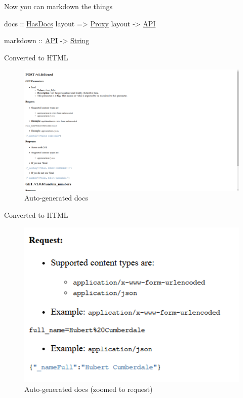 \documentclass[ignorenonframetext,]{beamer}
\newenvironment{Shaded}{}{}
\newcommand{\DataTypeTok}[1]{\underline{{#1}}}
\newcommand{\OtherTok}[1]{{#1}}
\newcommand{\NormalTok}[1]{{#1}}
\begin{document}
\begin{frame}[fragile]{Now you can markdown the things}

\begin{Shaded}
\begin{Highlighting}[]
\OtherTok{docs ::} \DataTypeTok{HasDocs} \NormalTok{layout }\OtherTok{=>} \DataTypeTok{Proxy} \NormalTok{layout }\OtherTok{->} \DataTypeTok{API}                                   

\OtherTok{markdown ::} \DataTypeTok{API} \OtherTok{->} \DataTypeTok{String}
\end{Highlighting}
\end{Shaded}

\end{frame}

\begin{frame}{Converted to HTML}

\begin{figure}[htbp]
\centering
\includegraphics{big.png}
\caption{Auto-generated docs}
\end{figure}

\end{frame}

\begin{frame}{Converted to HTML}

\begin{figure}[htbp]
\centering
\includegraphics{zoomed.png}
\caption{Auto-generated docs (zoomed to request)}
\end{figure}

\end{frame}
\end{document}
